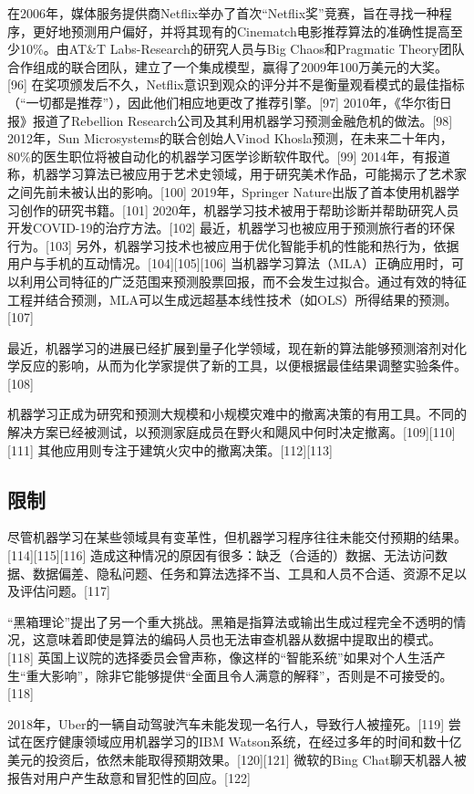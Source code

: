 在2006年，媒体服务提供商Netflix举办了首次“Netflix奖”竞赛，旨在寻找一种程序，更好地预测用户偏好，并将其现有的Cinematch电影推荐算法的准确性提高至少10\%。由AT&T Labs-Research的研究人员与Big Chaos和Pragmatic Theory团队合作组成的联合团队，建立了一个集成模型，赢得了2009年100万美元的大奖。[96] 在奖项颁发后不久，Netflix意识到观众的评分并不是衡量观看模式的最佳指标（“一切都是推荐”），因此他们相应地更改了推荐引擎。[97] 2010年，《华尔街日报》报道了Rebellion Research公司及其利用机器学习预测金融危机的做法。[98] 2012年，Sun Microsystems的联合创始人Vinod Khosla预测，在未来二十年内，80\%的医生职位将被自动化的机器学习医学诊断软件取代。[99] 2014年，有报道称，机器学习算法已被应用于艺术史领域，用于研究美术作品，可能揭示了艺术家之间先前未被认出的影响。[100] 2019年，Springer Nature出版了首本使用机器学习创作的研究书籍。[101] 2020年，机器学习技术被用于帮助诊断并帮助研究人员开发COVID-19的治疗方法。[102] 最近，机器学习也被应用于预测旅行者的环保行为。[103] 另外，机器学习技术也被应用于优化智能手机的性能和热行为，依据用户与手机的互动情况。[104][105][106] 当机器学习算法（MLA）正确应用时，可以利用公司特征的广泛范围来预测股票回报，而不会发生过拟合。通过有效的特征工程并结合预测，MLA可以生成远超基本线性技术（如OLS）所得结果的预测。[107]

最近，机器学习的进展已经扩展到量子化学领域，现在新的算法能够预测溶剂对化学反应的影响，从而为化学家提供了新的工具，以便根据最佳结果调整实验条件。[108]

机器学习正成为研究和预测大规模和小规模灾难中的撤离决策的有用工具。不同的解决方案已经被测试，以预测家庭成员在野火和飓风中何时决定撤离。[109][110][111] 其他应用则专注于建筑火灾中的撤离决策。[112][113]
\subsection{限制}
尽管机器学习在某些领域具有变革性，但机器学习程序往往未能交付预期的结果。[114][115][116] 造成这种情况的原因有很多：缺乏（合适的）数据、无法访问数据、数据偏差、隐私问题、任务和算法选择不当、工具和人员不合适、资源不足以及评估问题。[117]

“黑箱理论”提出了另一个重大挑战。黑箱是指算法或输出生成过程完全不透明的情况，这意味着即使是算法的编码人员也无法审查机器从数据中提取出的模式。[118] 英国上议院的选择委员会曾声称，像这样的“智能系统”如果对个人生活产生“重大影响”，除非它能够提供“全面且令人满意的解释”，否则是不可接受的。[118]

2018年，Uber的一辆自动驾驶汽车未能发现一名行人，导致行人被撞死。[119] 尝试在医疗健康领域应用机器学习的IBM Watson系统，在经过多年的时间和数十亿美元的投资后，依然未能取得预期效果。[120][121] 微软的Bing Chat聊天机器人被报告对用户产生敌意和冒犯性的回应。[122]

